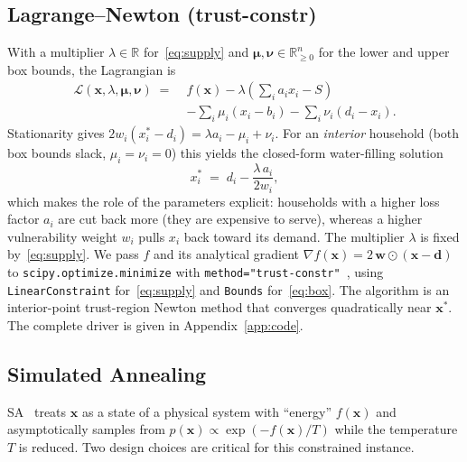\subsection{Lagrange--Newton (trust-constr)}
With a multiplier $\lambda \in \mathbb{R}$ for~\eqref{eq:supply}
and $\boldsymbol{\mu}, \boldsymbol{\nu} \in \mathbb{R}_{\geq
0}^{n}$ for the lower and upper box bounds, the Lagrangian is
\begin{equation}
\begin{aligned}
  \mathcal{L}(\mathbf{x},\lambda,\boldsymbol{\mu},\boldsymbol{\nu})
  \;=\;& f(\mathbf{x})
  - \lambda\!\left(\textstyle\sum_i a_i x_i - S\right) \\
  &- \textstyle\sum_i \mu_i (x_i - b_i)
    - \textstyle\sum_i \nu_i (d_i - x_i).
\end{aligned}
\label{eq:lagrangian}
\end{equation}
Stationarity gives $2 w_i (x_i^{*} - d_i) = \lambda a_i - \mu_i +
\nu_i$. For an \emph{interior} household (both box bounds slack,
$\mu_i = \nu_i = 0$) this yields the closed-form water-filling
solution
\begin{equation}
  x_i^{*} \;=\; d_i - \frac{\lambda\, a_i}{2 w_i},
  \label{eq:waterfilling}
\end{equation}
which makes the role of the parameters explicit: households with
a higher loss factor $a_i$ are cut back more (they are expensive
to serve), whereas a higher vulnerability weight $w_i$ pulls
$x_i$ back toward its demand. The multiplier $\lambda$ is fixed
by~\eqref{eq:supply}. We pass $f$ and its analytical gradient
$\nabla f(\mathbf{x}) = 2\,\mathbf{w}\odot(\mathbf{x} -
\mathbf{d})$ to \texttt{scipy.optimize.minimize} with
\texttt{method=\mbox{"trust-constr"}}~\citep{scipy2020}, using
\texttt{LinearConstraint} for~\eqref{eq:supply} and
\texttt{Bounds} for~\eqref{eq:box}. The algorithm is an
interior-point trust-region Newton method that converges
quadratically near $\mathbf{x}^{*}$. The complete driver is given
in Appendix~\ref{app:code}.

\subsection{Simulated Annealing}
SA~\citep{kirkpatrick1983,metropolis1953} treats $\mathbf{x}$ as
a state of a physical system with ``energy'' $f(\mathbf{x})$ and
asymptotically samples from $p(\mathbf{x}) \propto
\exp(-f(\mathbf{x})/T)$ while the temperature $T$ is reduced.
Two design choices are critical for this constrained instance.

